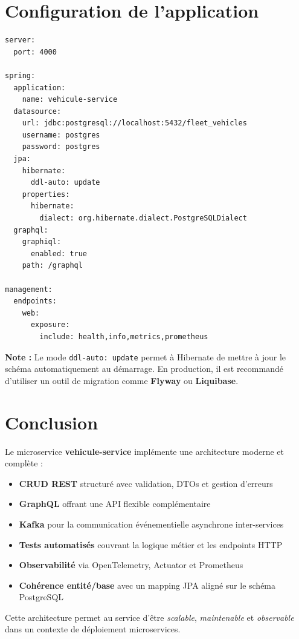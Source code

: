 \documentclass[12pt,a4paper]{report}
\begin{document}
\chapter{Configuration de l'application}

\begin{lstlisting}[style=yamlstyle, caption={application.yml -- Configuration compl\`ete}]
server:
  port: 4000

spring:
  application:
    name: vehicule-service
  datasource:
    url: jdbc:postgresql://localhost:5432/fleet_vehicles
    username: postgres
    password: postgres
  jpa:
    hibernate:
      ddl-auto: update
    properties:
      hibernate:
        dialect: org.hibernate.dialect.PostgreSQLDialect
  graphql:
    graphiql:
      enabled: true
    path: /graphql

management:
  endpoints:
    web:
      exposure:
        include: health,info,metrics,prometheus
\end{lstlisting}

\begin{infobox}
\textbf{Note :} Le mode \texttt{ddl-auto: update} permet \`a Hibernate de mettre \`a jour le sch\'ema automatiquement au d\'emarrage. En production, il est recommand\'e d'utiliser un outil de migration comme \textbf{Flyway} ou \textbf{Liquibase}.
\end{infobox}

\chapter{Conclusion}

Le microservice \textbf{vehicule-service} impl\'emente une architecture moderne et compl\`ete :

\begin{itemize}
    \item \textbf{CRUD REST} structur\'e avec validation, DTOs et gestion d'erreurs
    \item \textbf{GraphQL} offrant une API flexible compl\'ementaire
    \item \textbf{Kafka} pour la communication \'ev\'enementielle asynchrone inter-services
    \item \textbf{Tests automatis\'es} couvrant la logique m\'etier et les endpoints HTTP
    \item \textbf{Observabilit\'e} via OpenTelemetry, Actuator et Prometheus
    \item \textbf{Coh\'erence entit\'e/base} avec un mapping JPA align\'e sur le sch\'ema PostgreSQL
\end{itemize}

Cette architecture permet au service d'\^etre \textit{scalable}, \textit{maintenable} et \textit{observable} dans un contexte de d\'eploiement microservices.
\end{document}
